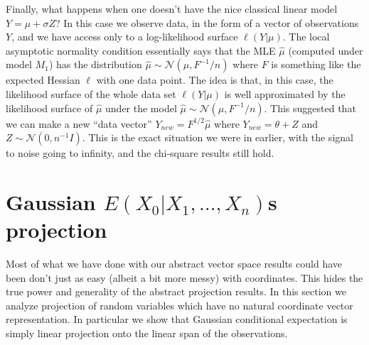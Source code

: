 \documentclass[11pt]{report}
\begin{document}
Finally, what happens when one doesn't have the nice classical linear model $Y = \mu + \sigma Z$? In this case we observe data, in the form of a vector of observations $Y$, and we have access only to a log-likelihood surface $\ell(Y|\mu)$. The local asymptotic normality condition essentially says that the MLE $\hat\mu$ (computed under model $M_1$) has the distribution $\hat\mu \sim \mathcal N(\mu, F^{-1}/n)$ where $F$ is something like the expected Hessian $\ell$ with one data point. The idea is that, in this case, the likelihood surface of the whole data set $\ell(Y|\mu)$ is well approximated by the likelihood surface of $\hat\mu$ under the model $\hat\mu \sim \mathcal N(\mu, F^{-1}/n)$. This suggested that we can make a new ``data vector'' $Y_{new} = F^{1/2}\hat\mu$ where $Y_{new}= \theta + Z$ and $Z\sim \mathcal N(0, n^{-1}I)$. This is the exact situation we were in earlier, with the signal to noise going to infinity, and the chi-square results still hold.

\section{Gaussian \texorpdfstring{$E(X_0|X_1,\ldots, X_n)$} as projection}


Most of what we have done with our abstract vector space results could have been don't just as easy (albeit a bit more messy) with coordinates. This hides the true power and generality of the abstract projection results. In this section we analyze projection of random variables which have no natural coordinate vector representation. In particular we show that Gaussian conditional expectation is simply linear projection onto the linear span of the observations. 
\end{document}
